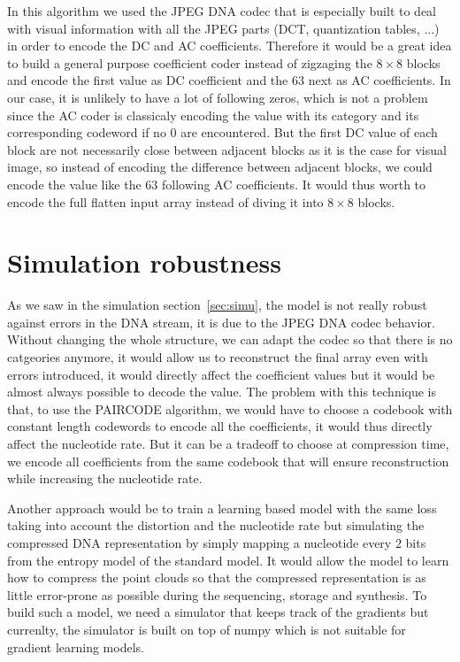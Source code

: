 In this algorithm we used the JPEG DNA codec that is especially built to deal with visual information with all the JPEG parts (DCT, quantization tables, ...) in order to encode the DC and AC coefficients. 
Therefore it would be a great idea to build a general purpose coefficient coder instead of zigzaging the $8 \times 8$ blocks and encode the first value as DC coefficient and the $63$ next as AC coefficients. In our case, it is unlikely to have a lot of following zeros, which is not a problem since the AC coder is classicaly encoding the value with its category and its corresponding codeword if no $0$ are encountered.
But the first DC value of each block are not necessarily close between adjacent blocks as it is the case for visual image, so instead of encoding the difference between adjacent blocks, we could encode the value like the $63$ following AC coefficients.
It would thus worth to encode the full flatten input array instead of diving it into $8 \times 8$ blocks. 


\section{Simulation robustness}

As we saw in the simulation section~\ref{sec:simu}, the model is not really robust against errors in the DNA stream, it is due to the JPEG DNA codec behavior. Without changing the whole structure, we can adapt the codec so that there is no catgeories anymore, it would allow us to reconstruct the final array even with errors introduced, it would directly affect the coefficient values but it would be almost always possible to decode the value. The problem with this technique is that, to use the PAIRCODE algorithm, we would have to choose a codebook with constant length codewords to encode all the coefficients, it would thus directly affect the nucleotide rate. But it can be a tradeoff to choose at compression time, we encode all coefficients from the same codebook that will ensure reconstruction while increasing the nucleotide rate.

Another approach would be to train a learning based model with the same loss taking into account the distortion and the nucleotide rate but simulating the compressed DNA representation by simply mapping a nucleotide every $2$ bits from the entropy model of the standard model. It would allow the model to learn how to compress the point clouds so that the compressed representation is as little error-prone as possible during the sequencing, storage and synthesis.
To build such a model, we need a simulator that keeps track of the gradients but currenlty, the simulator is built on top of numpy which is not suitable for gradient learning models. 
